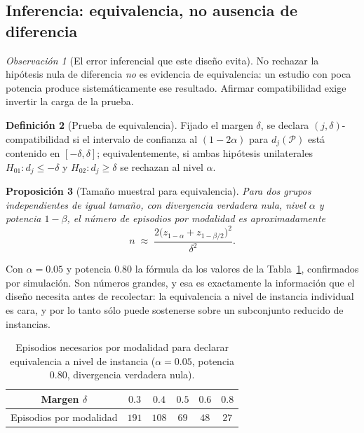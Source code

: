 \documentclass[11pt,a4paper]{article}
\theoremstyle{definition}
\newtheorem{definicion}{Definición}[section]
\theoremstyle{plain}
\newtheorem{proposicion}[definicion]{Proposición}
\theoremstyle{remark}
\newtheorem{observacion}[definicion]{Observación}
\begin{document}
\subsection{Inferencia: equivalencia, no ausencia de diferencia}

\begin{observacion}[El error inferencial que este diseño evita]\label{obs:tost}
No rechazar la hipótesis nula de diferencia \emph{no} es evidencia de
equivalencia: un estudio con poca potencia produce sistemáticamente ese resultado.
Afirmar compatibilidad exige invertir la carga de la prueba.
\end{observacion}

\begin{definicion}[Prueba de equivalencia]\label{def:tost}
Fijado el margen $\delta$, se declara $(j,\delta)$-compatibilidad si el intervalo
de confianza al $(1-2\alpha)$ para $d_j(\mathcal{P})$ está contenido en
$[-\delta,\delta]$; equivalentemente, si ambas hipótesis unilaterales
$H_{01}: d_j\le-\delta$ y $H_{02}: d_j\ge\delta$ se rechazan al nivel $\alpha$.
\end{definicion}

\begin{proposicion}[Tamaño muestral para equivalencia]\label{prop:potencia}
Para dos grupos independientes de igual tamaño, con divergencia verdadera nula,
nivel $\alpha$ y potencia $1-\beta$, el número de episodios por modalidad es
aproximadamente
\[
  n\;\approx\;\frac{2\big(z_{1-\alpha}+z_{1-\beta/2}\big)^{2}}{\delta^{2}} .
\]
\end{proposicion}

Con $\alpha=0.05$ y potencia $0.80$ la fórmula da los valores de la
Tabla~\ref{tab:potencia}, confirmados por simulación. Son números grandes, y esa
es exactamente la información que el diseño necesita antes de recolectar: la
equivalencia a nivel de instancia individual es cara, y por lo tanto sólo puede
sostenerse sobre un subconjunto reducido de instancias.

\begin{table}[t]
\centering
\begin{tabular}{@{}cccccc@{}}
\toprule
Margen $\delta$ & $0.3$ & $0.4$ & $0.5$ & $0.6$ & $0.8$ \\
\midrule
Episodios por modalidad & $191$ & $108$ & $69$ & $48$ & $27$ \\
\bottomrule
\end{tabular}
\caption{Episodios necesarios por modalidad para declarar equivalencia a nivel de
instancia ($\alpha=0.05$, potencia $0.80$, divergencia verdadera nula).}
\label{tab:potencia}
\end{table}
\end{document}
